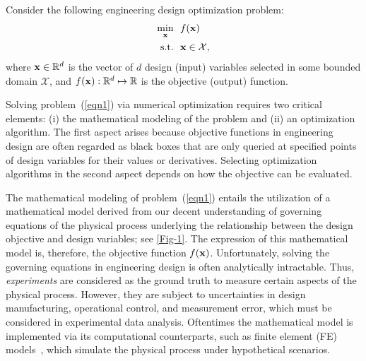\documentclass[iicol,sn-basic]{sn-jnl}%
\begin{document}
Consider the following engineering design optimization problem:
\begin{equation}\label{eqn1}
	\begin{aligned}
		\underset{\bf x}{\min} \ \ & f(\bf x)\\
		\textrm{s.t.} \ \ 
		& \bf x \in \mathcal{X}, 
	\end{aligned}
\end{equation} 
where ${\bf x} \in \mathbb{R}^d$ is the vector of $d$ design (input) variables selected in some bounded domain $\mathcal{X}$, and $f({\bf x}):\mathbb{R}^d \mapsto \mathbb{R}$ is the objective (output) function.

Solving problem~(\ref{eqn1}) via numerical optimization requires two critical elements: (i) the mathematical modeling of the problem and (ii) an optimization algorithm.
The first aspect arises because objective functions in engineering design are often regarded as black boxes that are only queried at specified points of design variables for their values or derivatives.
Selecting optimization algorithms in the second aspect depends on how the objective can be evaluated. 

The mathematical modeling of problem~(\ref{eqn1}) entails the utilization of a mathematical model derived from our decent understanding of governing equations of the physical process underlying the relationship between the design objective and design variables; see \cref{Fig-1}.
The expression of this mathematical model is, therefore, the objective function $f(\bf x)$.
Unfortunately, solving the governing equations in engineering design is often analytically intractable.
Thus, \textit{experiments} are considered as the ground truth to measure certain aspects of the physical process.
However, they are subject to uncertainties in design manufacturing, operational control, and measurement error, which must be considered in experimental data analysis.
Oftentimes the mathematical model is implemented via its computational counterparts, such as finite element (FE) models~\citep{Bathe2006}, which simulate the physical process under hypothetical scenarios.
\end{document}

